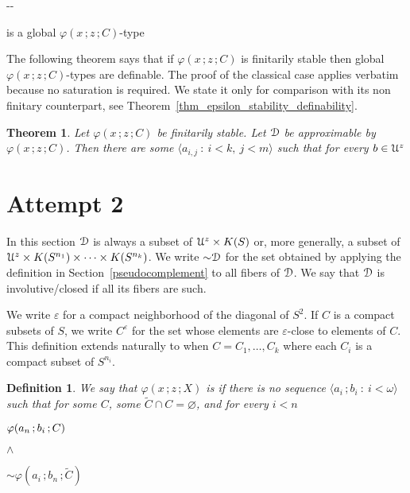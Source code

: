 \documentclass{amsproc}
\newcounter{thm}
\theoremstyle{mio}
\newtheorem{theorem}[thm]{Theorem}\tcolorboxenvironment{theorem}{mythm}
\newtheorem{definition}[thm]{Definition}\tcolorboxenvironment{definition}{mythm}
\renewcommand*{\emph}[1]{%
   \smash{\tikz[baseline]\node[rectangle, fill=teal!25, rounded corners, inner xsep=0.5ex, inner ysep=0.2ex, anchor=base, minimum height = 2.7ex]{\strut #1};}}
\begin{document}
  \noindent\kern-\kern-

is a global $\varphi(x\,;z\,;C)$-type\smallskip

The following theorem says that if $\varphi(x\,;z\,;C)$ is finitarily stable then global $\varphi(x\,;z\,;C)$-types are definable.
The proof of the classical case applies verbatim because no saturation is required.
We state it only for comparison with its non finitary counterpart, see Theorem~\ref{thm_epsilon_stability_definability}.

\begin{theorem}
  Let $\varphi(x\,;z\,;C)$ be finitarily stable.
  Let ${\EuScript D}$ be approximable by $\varphi(x\,;z\,;C)$.
  Then there are some $\langle a_{i,j}\ :\ i< k,\ j<m\rangle$ such that for every $b\in{\EuScript U}^z$\medskip

\end{theorem}


\section{Attempt 2}
\def\medrel#1{\parbox{5ex}{\hfil $#1$}}
\def\ceq#1#2#3{\parbox[t]{22ex}{$\displaystyle #1$}\medrel{#2}{$\displaystyle #3$}}

In this section  ${\EuScript D}$ is always a subset of ${\EuScript U}^z\times K(S)$ or, more generally, a subset of  ${\EuScript U}^z\times K(S^{n_1})\times\dots\times K(S^{n_k})$.
We write ${\sim}{\EuScript D}$ for the set obtained by applying the definition in Section~\ref{pseudocomplement} to all fibers of ${\EuScript D}$.
We say that ${\EuScript D}$ is involutive/closed if all its fibers are such.

We write $\varepsilon$ for a compact neighborhood of the diagonal of $S^2$.
If $C$ is a compact subsets of $S$, we write $C^\varepsilon$ for the set whose elements are $\varepsilon$-close to elements of $C$.
This definition extends naturally to when $C=C_1,\dots,C_k$ where each $C_i$ is a compact subset of $S^{n_i}$.

\begin{definition}\strut
  We say that $\varphi(x\,;z\,;X)$ is \emph{stable\/} if there is no sequence $\langle a_i\,;b_i\ :\ i<\omega\rangle$ such that for some $C$, some $\tilde C\cap C=\varnothing$, and for every $i<n$\smallskip

    \ceq{\hfill \varphi(a_n\,;b_i\,;C)}{\wedge}{{\sim}\varphi(a_i\,;b_n\,;\tilde C)}\smallskip

\end{definition}
\end{document}
